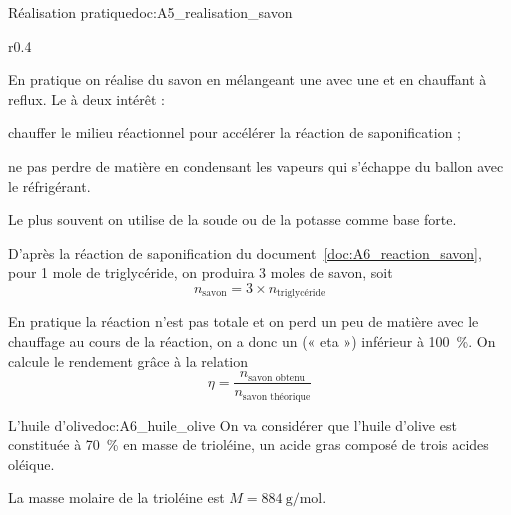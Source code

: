 \begin{doc}{Réalisation pratique}{doc:A5_realisation_savon}
  \begin{wrapfigure}{r}{0.4\linewidth}
    \centering
    \vspace*{-32pt}
  \end{wrapfigure}
  En pratique on réalise du savon en mélangeant une  avec une  et en chauffant à reflux.
  Le  à deux intérêt :
  \begin{listePoints}
    \item chauffer le milieu réactionnel pour accélérer la réaction de saponification ;
    \item ne pas perdre de matière en condensant les vapeurs qui s'échappe du ballon avec le réfrigérant.
  \end{listePoints}

  Le plus souvent on utilise de la soude  ou de la potasse  comme base forte.

  D'après la réaction de saponification du document~\ref{doc:A6_reaction_savon}, pour 1 mole de triglycéride, on produira 3 moles de savon, soit
  \begin{equation*}
    n_\text{savon} = 3\times n_\text{triglycéride}
  \end{equation*}

  En pratique la réaction n'est pas totale et on perd un peu de matière avec le chauffage au cours de la réaction, on a donc un  (« eta »)  inférieur à \qty{100}{\percent}.
  On calcule le rendement grâce à la relation
  \begin{equation*}
    \eta = \dfrac{n_\text{savon obtenu}}{n_\text{savon théorique}}
  \end{equation*}
\end{doc}

\begin{doc}{L'huile d'olive}{doc:A6_huile_olive}
  On va considérer que l'huile d'olive est constituée à \qty{70}{\percent} en masse de trioléine, un acide gras composé de trois acides oléique.

  La masse molaire de la trioléine est $M = \qty{884}{\g\per\mole}$.
\end{doc}



